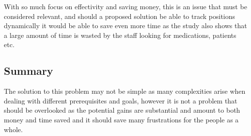 With so much focus on effectivity and saving money, this is an issue that must be considered relevant, and should a proposed solution be able to track positions dynamically it would be able to save even more time as the study also shows that a large amount of time is wasted by the staff looking for medications, patients etc.

\subsection{Summary}
The solution to this problem may not be simple as many complexities arise when dealing with different prerequisites and goals, however it is not a problem that should be overlooked as the potential gains are substantial and amount to both money and time saved and it should save many frustrations for the people as a whole.
